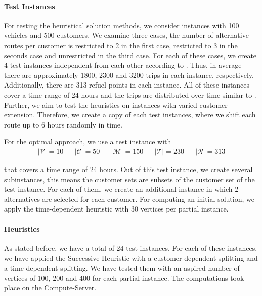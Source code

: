 \paragraph{Test Instances} \parfill

For testing the heuristical solution methods, we consider instances with 100 vehicles and 500 customers. We examine three cases, the number of alternative routes per customer is restricted to 2 in the first case, restricted to 3 in the seconds case and unrestricted in the third case. For each of these cases, we create 4 test instances independent from each other according to . Thus, in average there are approximately 1800, 2300 and 3200 trips in each instance, respectively. Additionally, there are 313 refuel points in each instance. All of these instances cover a time range of 24 hours and the trips are distributed over time similar to . Further, we aim to test the heuristics on instances with varied customer extension. Therefore, we create a copy of each test instances, where we shift each route up to 6 hours randomly in time.

For the optimal approach, we use a test instance with
\begin{align*}
	\vert\mathcal{V}\vert = 10 && \vert\mathcal{C}\vert = 50 && \vert\mathcal{M}\vert = 150 && \vert\mathcal{T}\vert = 230 && \vert\mathcal{R}\vert = 313
\end{align*}

that covers a time range of 24 hours. Out of this test instance, we create several subinstances, this means the customer sets are subsets of the customer set of the test instance. For each of them, we create an additional instance in which 2 alternatives are selected for each customer. For computing an initial solution, we apply the time-dependent heuristic with 30 vertices per partial instance.

\paragraph{Heuristics} \parfill

As stated before, we have a total of 24 test instances. For each of these instances, we have applied the Successive Heuristic with a customer-dependent splitting and a time-dependent splitting. We have tested them with an aspired number of vertices of 100, 200 and 400 for each partial instance. The computations took place on the Compute-Server.

